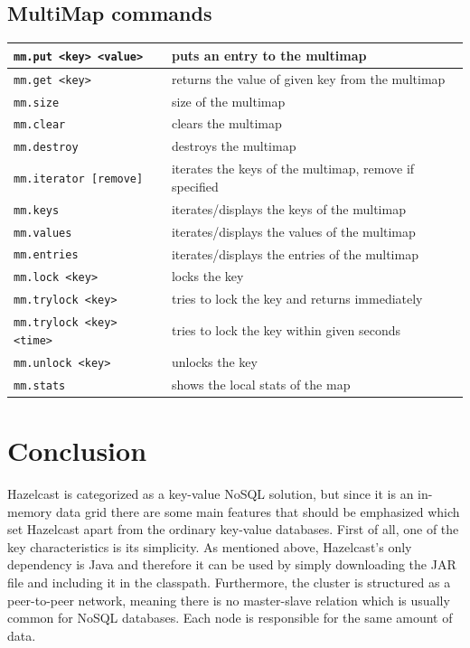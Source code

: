 \subsection*{MultiMap commands}
\begin{tabular}{|p{}|p{}|}
    \hline
    \texttt{mm.put <key> <value>} & puts an entry to the multimap\\\hline
    \texttt{mm.get <key>} & returns the value of given key from the multimap\\\hline
    \texttt{mm.size} & size of the multimap\\\hline
    \texttt{mm.clear} & clears the multimap\\\hline
    \texttt{mm.destroy} & destroys the multimap\\\hline
    \texttt{mm.iterator [remove]} & iterates the keys of the multimap, remove if specified\\\hline
    \texttt{mm.keys} & iterates/displays the keys of the multimap\\\hline
    \texttt{mm.values} & iterates/displays the values of the multimap\\\hline
    \texttt{mm.entries} & iterates/displays the entries of the multimap\\\hline
    \texttt{mm.lock <key>} & locks the key\\\hline
    \texttt{mm.trylock <key>} & tries to lock the key and returns immediately\\\hline
    \texttt{mm.trylock <key> <time>} & tries to lock the key within given seconds\\\hline
    \texttt{mm.unlock <key>} & unlocks the key\\\hline
    \texttt{mm.stats} & shows the local stats of the map\\\hline    
\end{tabular}

\section{Conclusion}
Hazelcast is categorized as a key-value NoSQL solution, but since it is an in-memory data grid there are some main features that should be emphasized which set Hazelcast apart from the ordinary key-value databases.
First of all, one of the key characteristics is its simplicity. As mentioned above, Hazelcast’s only dependency is Java and therefore it can be used by simply downloading the JAR file and including it in the classpath.
Furthermore, the cluster is structured as a peer-to-peer network, meaning there is no master-slave relation which is usually common for NoSQL databases. Each node is responsible for the same amount of data.

